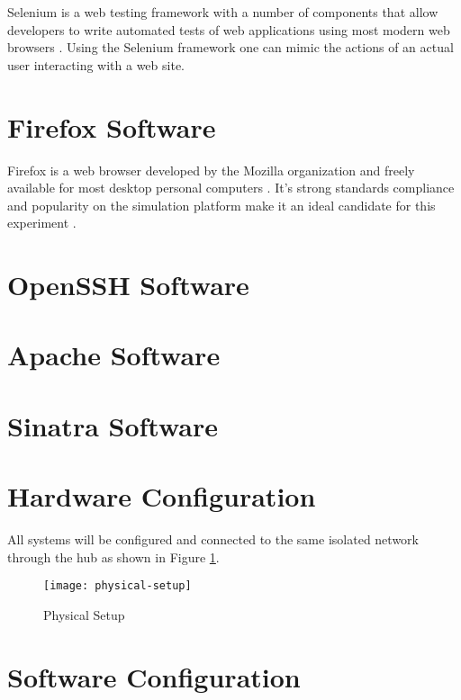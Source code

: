 Selenium is a web testing framework with a number of components that allow
developers to write automated tests of web applications using most modern web
browsers \parencite{:2010ys}. Using the Selenium framework one can mimic the
actions of an actual user interacting with a web site.

\section{Firefox Software}

Firefox is a web browser developed by the Mozilla organization and freely
available for most desktop personal computers \parencite{mozilla}. It's strong
standards compliance \parencite{Hammond:2010fk} and popularity
\parencite{:2010kx,:2010vn} on the simulation platform make it an ideal candidate for
this experiment .

\section{OpenSSH Software}

\cite{Tucker:2010ly}
\cite{:2010zr}
\cite{:ve}

\section{Apache Software}

\cite{:qf}

\section{Sinatra Software}







\section{Hardware Configuration}

All systems will be configured and connected to the same isolated network
through the hub as shown in Figure \ref{physical-setup}.

\begin{figure}[H]
  \centering\texttt{[image: physical-setup]}
  \caption{Physical Setup}
  \label{physical-setup}
\end{figure}

\section{Software Configuration}

